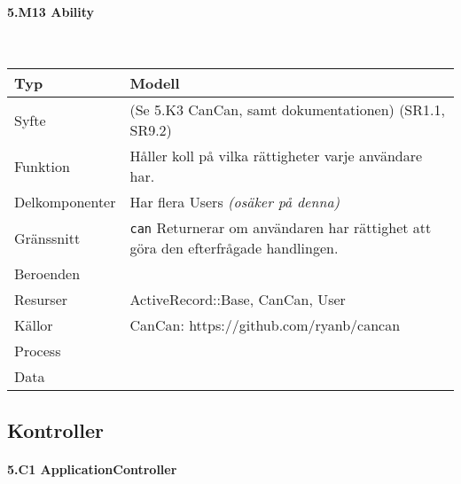 \documentclass[a4paper, twoside, 11pt, titlepage]{article}
\begin{document}
			\paragraph{5.M13 Ability}\

			\begin {table} [ht] \begin{tabular} {  p{3.5cm} p{9.6cm} }
				\hline
				{Typ} & {Modell} \\
				\hline
				{Syfte} & {(Se 5.K3 CanCan, samt dokumentationen) (SR1.1, SR9.2)} \\
				\hline
				{Funktion} & {Håller koll på vilka rättigheter varje användare har.} \\
				\hline
				{Delkomponenter} & {Har flera Users \emph{(osäker på denna)}} \\
				\hline
				{Gränssnitt} & {{\tt can} Returnerar om användaren har rättighet att göra den efterfrågade handlingen.} \\
				\hline
				{Beroenden} & { } \\
				\hline
				{Resurser} & {ActiveRecord::Base, CanCan, User} \\
				\hline
				{Källor} & {CanCan: https://github.com/ryanb/cancan} \\
				\hline
				{Process} & { } \\
				\hline
				{Data} & { } \\
				\hline
			\end{tabular} \end{table} \FloatBarrier


	\subsection{Kontroller}



			\paragraph{5.C1 ApplicationController}\
\end{document}

